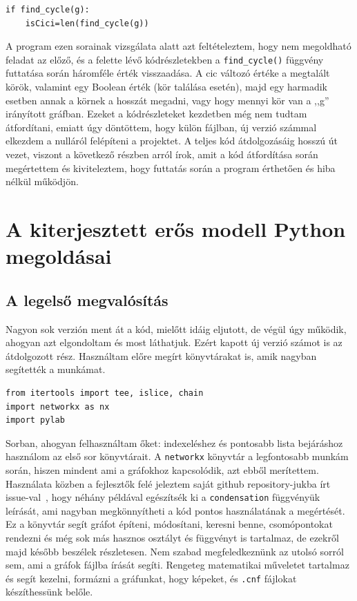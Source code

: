 \documentclass[
]{thesis-ekf}
\theoremstyle{definition}
\theoremstyle{remark}
\begin{document}
	\begin{lstlisting}
if find_cycle(g):
	isCici=len(find_cycle(g))
	\end{lstlisting}

	A program ezen sorainak vizsgálata alatt azt feltételeztem, hogy nem megoldható feladat az előző, és a felette lévő kódrészletekben a \texttt{find\_cycle()} függvény futtatása során háromféle érték visszaadása. A cic változó értéke a megtalált körök, valamint egy Boolean érték (kör találása esetén), majd egy harmadik esetben annak a körnek a hosszát megadni, vagy hogy mennyi kör van a ,,g'' irányított gráfban. Ezeket a kódrészleteket kezdetben még nem tudtam átfordítani, emiatt úgy döntöttem, hogy külön fájlban, új verzió számmal elkezdem a nulláról felépíteni a projektet. A teljes kód átdolgozásáig hosszú út vezet, viszont a következő részben arról írok, amit a kód átfordítása során megértettem és kiviteleztem, hogy futtatás során a program érthetően és hiba nélkül működjön.
	
	\section{A kiterjesztett erős modell Python megoldásai}
	\subsection{A legelső megvalósítás}
	
	Nagyon sok verzión ment át a kód, mielőtt idáig eljutott, de végül úgy működik, ahogyan azt elgondoltam és most láthatjuk. Ezért kapott új verzió számot is az átdolgozott rész. Használtam előre megírt könyvtárakat is, amik nagyban segítették a munkámat.

	\begin{lstlisting}
from itertools import tee, islice, chain
import networkx as nx
import pylab
	\end{lstlisting}

	Sorban, ahogyan felhasználtam őket: indexeléshez és pontosabb lista bejáráshoz használom az első sor könyvtárait. A \texttt{networkx} könyvtár a legfontosabb munkám során, hiszen mindent ami a gráfokhoz kapcsolódik, azt ebből merítettem. Használata közben a fejlesztők felé jeleztem saját github repository-jukba írt issue-val~\cite{git-issue-for-examples}, hogy néhány példával egészítsék ki a \texttt{condensation} függvényük leírását, ami nagyban megkönnyítheti a kód pontos használatának a megértését. Ez a könyvtár segít gráfot építeni, módosítani, keresni benne, csomópontokat rendezni és még sok más hasznos osztályt és függvényt is tartalmaz, de ezekről majd később beszélek részletesen. Nem szabad megfeledkeznünk az utolsó sorról sem, ami a gráfok fájlba írását segíti. Rengeteg matematikai műveletet tartalmaz és segít kezelni, formázni a gráfunkat, hogy képeket, és \texttt{.cnf} fájlokat készíthessünk belőle.
	
\end{document}
